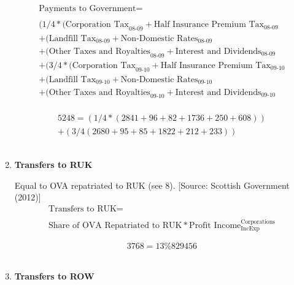 \begin{enumerate}
\begin{equation}
\begin{split}
\text{Payments to Government} =  \\ \\
(1/4*(\text{Corporation Tax}_\text{08-09}+\text{Half Insurance Premium Tax}_\text{08-09}\\
+(\text{Landfill Tax}_\text{08-09}+\text{Non-Domestic Rates}_\text{08-09}\\
+(\text{Other Taxes and Royalties}_\text{08-09}+\text{Interest and Dividends}_\text{08-09}\\
+(3/4*(\text{Corporation Tax}_\text{09-10}+\text{Half Insurance Premium Tax}_\text{09-10}\\
+(\text{Landfill Tax}_\text{09-10}+\text{Non-Domestic Rates}_\text{09-10}\\
+(\text{Other Taxes and Royalties}_\text{09-10}+\text{Interest and Dividends}_\text{09-10}\\
\end{split} \label{eq:2.5.30}
\end{equation}

\begin{equation} \nonumber
\begin{split}
5248 = (1/4*(2841+96+82+1736+250+608))\\
+(3/4(2680+95+85+1822+212+233))
\end{split}
\end{equation}\\


\item \textbf {Transfers to RUK}

Equal to OVA repatriated to RUK (see 8). [Source: Scottish Government (2012)]\\

\begin{equation}
\begin{split}
\text{Transfers to RUK} =  \\ \\
\text{Share of OVA Repatriated to RUK}*\text{Profit Income}^\text{Corporations}_\text{IncExp}
\end{split} \label{eq:2.5.31}
\end{equation}

\begin{equation} \nonumber
3768 = 13\%829456
\end{equation}\\


\item \textbf {Transfers to ROW}


\end{enumerate}

